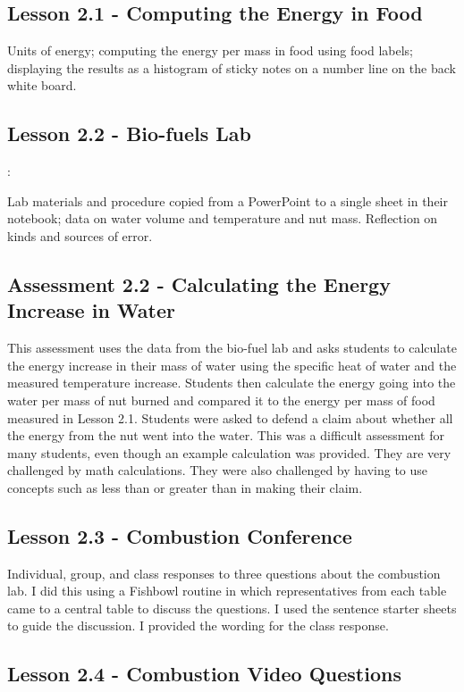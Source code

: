 \documentclass[12pt]{article}
\begin{document}
\subsection{Lesson 2.1 - Computing the Energy in Food} 

Units of energy; computing the energy per mass in food using food labels; displaying the results as a histogram of sticky notes on a number line on the back white board.

\subsection{Lesson 2.2 - Bio-fuels Lab}: 

Lab materials and procedure copied from a PowerPoint to a
single sheet in their notebook; data on water volume and temperature and nut mass. Reflection on kinds and sources of error.

\subsection*{Assessment 2.2 - Calculating the Energy Increase in Water} 

This assessment uses the data from the bio-fuel lab and asks students to calculate the energy increase in their mass of water
using the specific heat of water and the measured temperature increase. Students then calculate the energy going into the water per mass of nut burned and compared it to the energy
per mass of food measured in Lesson 2.1. Students were asked to defend a claim about whether all the energy from the nut went into the water. This was a difficult assessment for
many students, even though an example calculation was provided. They are very challenged by math calculations. They were also challenged by having to use concepts such as less than or
greater than in making their claim.

\subsection{Lesson 2.3 - Combustion Conference}

Individual, group, and class responses to three questions about the combustion lab. I did this using a Fishbowl routine in which
representatives from each table came to a central table to discuss the questions. I used the sentence starter sheets to guide the discussion. I provided the wording for the class
response.

\subsection{Lesson 2.4 - Combustion Video Questions} 
\end{document}
